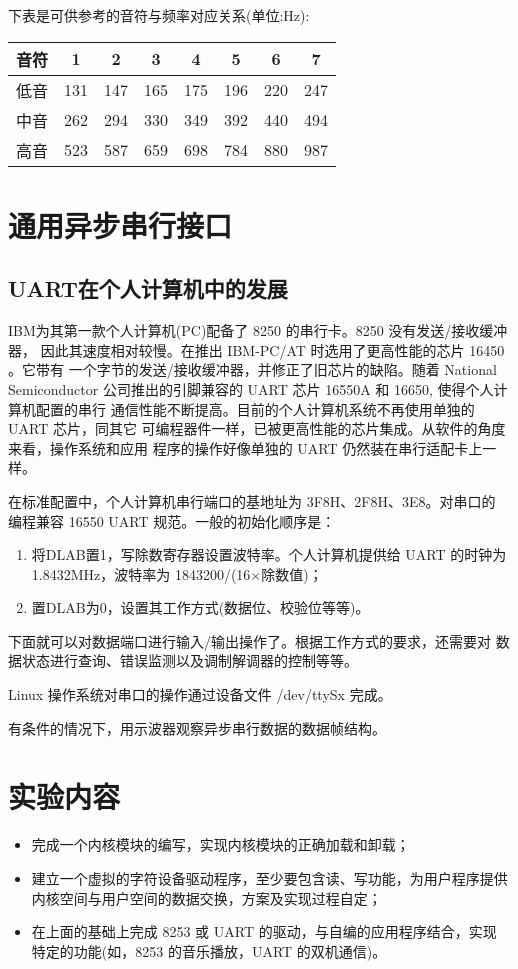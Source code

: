     下表是可供参考的音符与频率对应关系(单位:Hz):
\begin{table}[!h]
\centering\large
\begin{tabular}{|*8{|c}||} \hline
   音符 &  1  &  2  &  3  &  4  &  5  &  6  &  7\\\hline
   低音 & 131 & 147 & 165 & 175 & 196 & 220 & 247\\
   中音 & 262 & 294 & 330 & 349 & 392 & 440 & 494\\
   高音 & 523 & 587 & 659 & 698 & 784 & 880 & 987\\\hline
\end{tabular}
\end{table}

\section{通用异步串行接口}
\subsection{UART在个人计算机中的发展}
	IBM为其第一款个人计算机(PC)配备了 8250 的串行卡。8250 没有发送/接收缓冲器，
因此其速度相对较慢。在推出 IBM-PC/AT 时选用了更高性能的芯片 16450 。它带有
一个字节的发送/接收缓冲器，并修正了旧芯片的缺陷。随着 National Semiconductor
公司推出的引脚兼容的 UART 芯片 16550A 和 16650, 使得个人计算机配置的串行
通信性能不断提高。目前的个人计算机系统不再使用单独的 UART 芯片，同其它
可编程器件一样，已被更高性能的芯片集成。从软件的角度来看，操作系统和应用
程序的操作好像单独的 UART 仍然装在串行适配卡上一样。

	在标准配置中，个人计算机串行端口的基地址为 3F8H、2F8H、3E8。对串口的
编程兼容 16550 UART 规范。一般的初始化顺序是：
\begin{enumerate}\itemsep=-3pt
  \item 将DLAB置1，写除数寄存器设置波特率。个人计算机提供给 UART 的时钟为
        1.8432MHz，波特率为 1843200/(16$\times$除数值)；
  \item 置DLAB为0，设置其工作方式(数据位、校验位等等)。
\end{enumerate}

    下面就可以对数据端口进行输入/输出操作了。根据工作方式的要求，还需要对
数据状态进行查询、错误监测以及调制解调器的控制等等。

    Linux 操作系统对串口的操作通过设备文件 /dev/ttySx 完成。

    有条件的情况下，用示波器观察异步串行数据的数据帧结构。
\section{实验内容}
\begin{itemize}\itemsep=-3pt
  \item 完成一个内核模块的编写，实现内核模块的正确加载和卸载；
  \item 建立一个虚拟的字符设备驱动程序，至少要包含读、写功能，为用户程序提供
        内核空间与用户空间的数据交换，方案及实现过程自定；
  \item 在上面的基础上完成 8253 或 UART 的驱动，与自编的应用程序结合，实现
		特定的功能(如，8253 的音乐播放，UART 的双机通信)。
\end{itemize}

